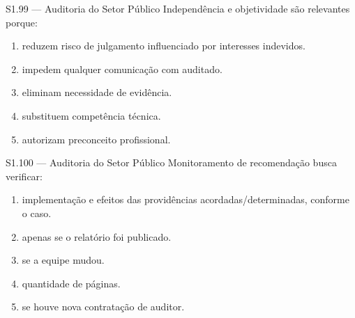 \begin{questao}{S1.99 — Auditoria do Setor Público}
Independência e objetividade são relevantes porque:
\begin{enumerate}[label=\Alph*)]\item reduzem risco de julgamento influenciado por interesses indevidos.\item impedem qualquer comunicação com auditado.\item eliminam necessidade de evidência.\item substituem competência técnica.\item autorizam preconceito profissional.\end{enumerate}
\end{questao}

\begin{questao}{S1.100 — Auditoria do Setor Público}
Monitoramento de recomendação busca verificar:
\begin{enumerate}[label=\Alph*)]\item implementação e efeitos das providências acordadas/determinadas, conforme o caso.\item apenas se o relatório foi publicado.\item se a equipe mudou.\item quantidade de páginas.\item se houve nova contratação de auditor.\end{enumerate}
\end{questao}
